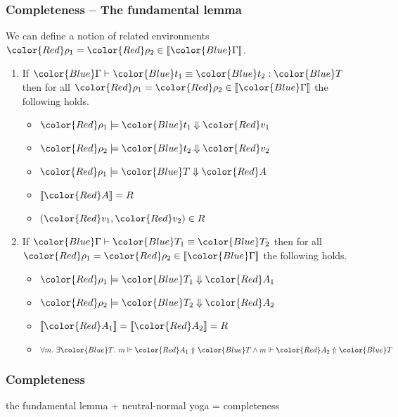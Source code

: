 \documentclass[svgnames]{beamer}
\newcommand\fmttm[1]{{\color{Blue}#1}}
\newcommand\fmtval[1]{{\color{Red}#1}}
\newcommand{\sem}[1]{\llbracket #1 \rrbracket}
\newcommand{\eqterm}[4]{\fmttm{#1} \vdash \fmttm{#2} \equiv \fmttm{#3} : \fmttm{#4}}
\newcommand{\eqtype}[3]{\fmttm{#1}\vdash\fmttm{#2} \equiv \fmttm{#3}}
\newcommand{\gpheval}[3]{\fmtval{#1}\models\fmttm{#2}\Downarrow\fmtval{#3}}
\newcommand{\gphquotp}[3]{#1\Vdash\fmtval{#2}\Uparrow\fmttm{#3}}
\begin{document}
\begin{frame}
  \frametitle{Completeness -- The fundamental lemma}
  We can define a notion of related environments
  $\fmtval{\rho_1} = \fmtval{\rho_2} \in \sem{\fmttm{\Gamma}}$.

  \begin{enumerate}
  \item If $\eqterm{\Gamma}{t_1}{t_2}{T}$ then for all
    $\fmtval{\rho_1} = \fmtval{\rho_2} \in \sem{\fmttm{\Gamma}}$ the following holds.
    \begin{itemize}
    \item $\gpheval{\rho_1}{t_1}{v_1}$
    \item $\gpheval{\rho_2}{t_2}{v_2}$
    \item $\gpheval{\rho_1}{T}{A}$
    \item $\sem{\fmtval{A}} = R$
    \item $(\fmtval{v_1}, \fmtval{v_2}) \in R$
    \end{itemize}
  \item If $\eqtype{\Gamma}{T_1}{T_2}$ then for all
    $\fmtval{\rho_1} = \fmtval{\rho_2} \in \sem{\fmttm{\Gamma}}$ the following holds.
    \begin{itemize}
    \item $\gpheval{\rho_1}{T_1}{A_1}$
    \item $\gpheval{\rho_2}{T_2}{A_2}$
    \item $\sem{\fmtval{A_1}} = \sem{\fmtval{A_2}} = R$
    \item $\forall m.\ \exists \fmttm{T}.\ \gphquotp{m}{A_1}{T} \land \gphquotp{m}{A_2}{T}$
    \end{itemize}
  \end{enumerate}
\end{frame}

\begin{frame}
  \frametitle{Completeness}
  \centering
  the fundamental lemma + neutral-normal yoga = completeness
\end{frame}
\end{document}
